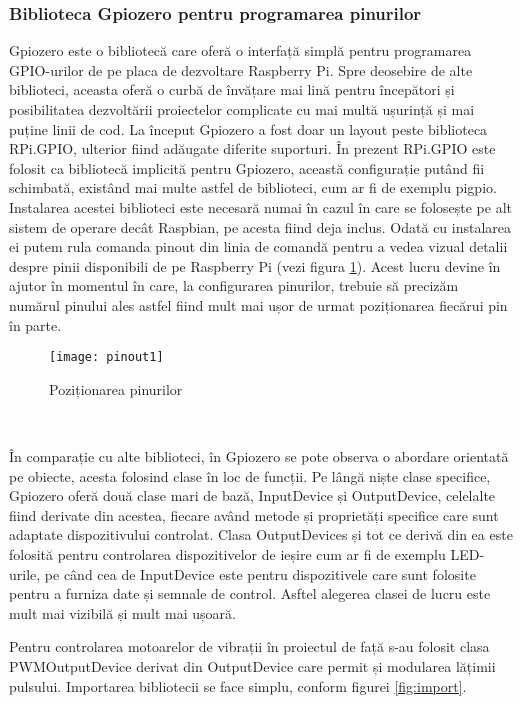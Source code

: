 \documentclass[../IoMusT.tex]{subfiles}
\begin{document}
\subsubsection{Biblioteca Gpiozero pentru programarea pinurilor}
Gpiozero este o bibliotecă care oferă o interfață simplă pentru programarea GPIO-urilor de pe placa de dezvoltare Raspberry Pi. Spre deosebire de alte biblioteci, aceasta oferă o curbă de învățare mai lină pentru începători și posibilitatea dezvoltării proiectelor complicate cu mai multă ușurință și mai puține linii de cod. La început Gpiozero a fost doar un layout peste biblioteca RPi.GPIO, ulterior fiind adăugate diferite suporturi. În prezent RPi.GPIO este folosit ca bibliotecă implicită pentru Gpiozero, această configurație putând fii schimbată, existând mai multe astfel de biblioteci, cum ar fi de exemplu pigpio. Instalarea acestei biblioteci este necesară numai în cazul în care se folosește pe alt sistem de operare decât Raspbian, pe acesta fiind deja inclus. Odată cu instalarea ei putem rula comanda pinout din linia de comandă pentru a vedea vizual detalii despre pinii disponibili de pe Raspberry Pi (vezi figura \ref{fig:pinout}). Acest lucru devine în ajutor în momentul în care, la configurarea pinurilor, trebuie să precizăm numărul pinului ales astfel fiind mult mai ușor de urmat poziționarea fiecărui pin în parte.
\begin{figure}[h]
\centering
\texttt{[image: pinout1]}
\caption{Poziționarea pinurilor}
\label{fig:pinout}
\end{figure}
\\
\par În comparație cu alte biblioteci, în Gpiozero se pote observa o abordare orientată pe obiecte, acesta folosind clase în loc de funcții. Pe lângă niște clase specifice, Gpiozero oferă două clase mari de bază, InputDevice și OutputDevice, celelalte fiind derivate din acestea, fiecare având metode și proprietăți specifice care sunt adaptate dispozitivului controlat. Clasa OutputDevices și tot ce derivă din ea este folosită pentru controlarea dis\-po\-zi\-ti\-ve\-lor de ieșire cum ar fi de exemplu LED-urile, pe când cea de InputDevice este pentru dis\-po\-zi\-ti\-ve\-le care sunt folosite pentru a furniza date și semnale de control. Asftel alegerea clasei de lucru este mult mai vizibilă și mult mai ușoară.
\\
\par Pentru controlarea motoarelor de vibrații în proiectul de față s-au folosit clasa PWMOutputDevice derivat din OutputDevice care permit și modularea lățimii pulsului. Importarea bibliotecii se face simplu, conform figurei \ref{fig:import}.
\end{document}
